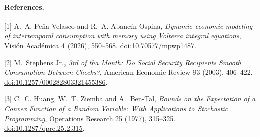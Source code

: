 \documentclass[11pt]{article}
\begin{document}
\small
\paragraph{References.}
[1] A.~A. Pe\~na Velasco and R.~A. Abanc\'in Ospina, \emph{Dynamic economic modeling of intertemporal consumption with memory using Volterra integral equations}, Visi\'on Acad\'emica 4 (2026), 550--568. \href{https://doi.org/10.70577/mpwp1487}{doi:10.70577/mpwp1487}.

[2] M.~Stephens Jr., \emph{3rd of tha Month: Do Social Security Recipients Smooth Consumption Between Checks?}, American Economic Review 93 (2003), 406--422. \href{https://doi.org/10.1257/000282803321455386}{doi:10.1257/000282803321455386}.

[3] C.~C. Huang, W.~T. Ziemba and A.~Ben-Tal, \emph{Bounds on the Expectation of a Convex Function of a Random Variable: With Applications to Stochastic Programming}, Operations Research 25 (1977), 315--325. \href{https://doi.org/10.1287/opre.25.2.315}{doi:10.1287/opre.25.2.315}.
\end{document}
